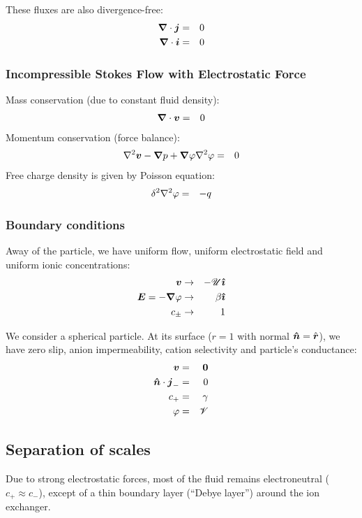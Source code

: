These fluxes are also divergence-free:
\begin{eqnarray}
\boldsymbol{\nabla} \cdot \boldsymbol{j} &=& 0 \\
\boldsymbol{\nabla} \cdot \boldsymbol{i} &=& 0 
\end{eqnarray}

\subsubsection{Incompressible Stokes Flow with Electrostatic Force}
Mass conservation (due to constant fluid density):
\begin{eqnarray}
\boldsymbol{\nabla} \cdot \boldsymbol{v} &=& 0
\end{eqnarray}
Momentum conservation (force balance):
\begin{eqnarray}
\nabla^2 \boldsymbol{v} - \boldsymbol{\nabla} p + \boldsymbol{\nabla} \varphi \nabla^2 \varphi &=& 0
\end{eqnarray}
Free charge density is given by Poisson equation:
\begin{eqnarray}
\delta^2 \nabla^2 \varphi &=& -q
\end{eqnarray}

\subsubsection{Boundary conditions}
Away of the particle, we have uniform flow, uniform electrostatic field
and uniform ionic concentrations:
\begin{eqnarray}
\boldsymbol{v} &\rightarrow& -\mathscr{U} \boldsymbol{\hat{\imath}} \\
\boldsymbol{E} = -\boldsymbol{\nabla} \varphi &\rightarrow& \beta\boldsymbol{\hat{\imath}} \\
c_\pm &\rightarrow& 1
\end{eqnarray}

We consider a spherical particle. At its surface ($r=1$ with normal $\boldsymbol{\hat{n}} = \hat{\boldsymbol{r}}$), 
we have zero slip, anion impermeability, cation selectivity and particle's conductance:
\begin{eqnarray}
\boldsymbol{v} & = & \boldsymbol{0} \\
\boldsymbol{\hat{n}} \cdot \boldsymbol{j}_- & = & 0 \\
c_+ & = & \gamma \\
\varphi & = & \mathscr{V}
\end{eqnarray}

\subsection{Separation of scales}
Due to strong electrostatic forces, 
most of the fluid remains electroneutral ($c_+ \approx c_-$), 
except of a thin boundary layer (``Debye layer'') around the ion exchanger. 

